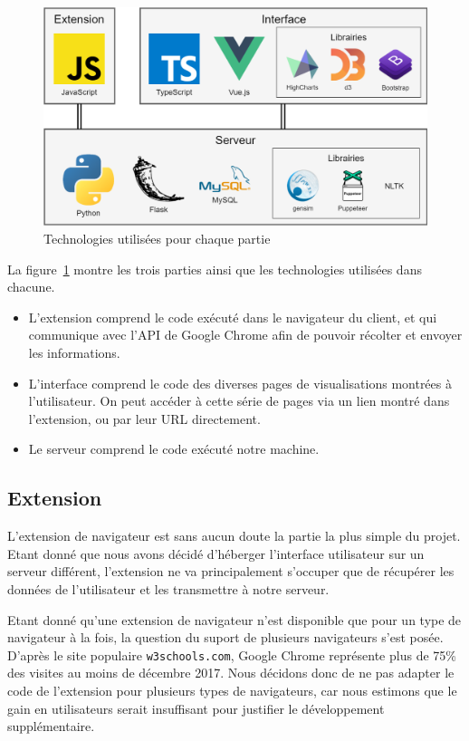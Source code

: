 		\begin{figure}[!h]
			\centering
			\includegraphics[width=1\textwidth]{images/design/stack}
			\caption{Technologies utilisées pour chaque partie}
			\label{d-stack}
		\end{figure}

		La figure~\ref{d-stack} montre les trois parties ainsi que les technologies utilisées dans chacune.

		\begin{itemize}
			\item L'extension comprend le code exécuté dans le navigateur du client, et qui communique avec l'API de Google Chrome afin de pouvoir récolter et envoyer les informations.
			\item L'interface comprend le code des diverses pages de visualisations montrées à l'utilisateur. On peut accéder à cette série de pages via un lien montré dans l'extension, ou par leur URL directement.
			\item Le serveur comprend le code exécuté notre machine.
		\end{itemize}

	\subsection{Extension}

		L'extension de navigateur est sans aucun doute la partie la plus simple du projet. Etant donné que nous avons décidé d'héberger l'interface utilisateur sur un serveur différent, l'extension ne va principalement s'occuper que de récupérer les données de l'utilisateur et les transmettre à notre serveur.

		Etant donné qu'une extension de navigateur n'est disponible que pour un type de navigateur à la fois, la question du suport de plusieurs navigateurs s'est posée. D'après le site populaire \texttt{w3schools.com}\cite{browser-stats}, Google Chrome représente plus de 75\% des visites au moins de décembre 2017. Nous décidons donc de ne pas adapter le code de l'extension pour plusieurs types de navigateurs, car nous estimons que le gain en utilisateurs serait insuffisant pour justifier le développement supplémentaire.

